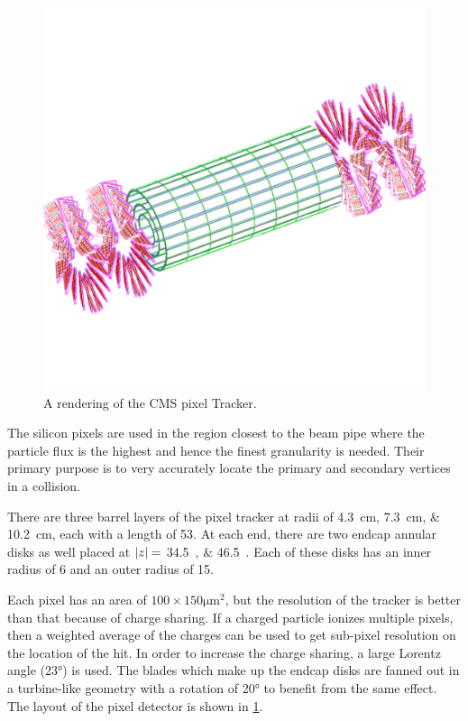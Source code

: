 \begin{figure}[!htbp]
    \centering
    \includegraphics[width=\textwidth]{figures/pixel_layout.pdf}
    \caption{
        A rendering of the CMS pixel Tracker.
    }
    \label{fig:pixel_layout}
\end{figure}

The silicon pixels are used in the region closest to the beam pipe where the
particle flux is the highest and hence the finest granularity is needed. Their
primary purpose is to very accurately locate the primary and secondary vertices
in a collision.

There are three barrel layers of the pixel tracker at radii of
\SIlist{4.3;7.3;10.2}{\centi\meter}, each with a length of
\SI{53}{\centi{\meter}}. At each end, there are two endcap annular disks as well
placed at $|z|=$ \SIlist{34.5;46.5}{\centi{\meter}}. Each of these disks
has an inner radius of \SI{6}{\centi{\meter}} and an outer radius of
\SI{15}{\centi{\meter}}.

Each pixel has an area of $100 \times 150 \si{\micro\meter\squared}$, but the
resolution of the tracker is better than that because of charge sharing. If a
charged particle ionizes multiple pixels, then a weighted average of the
charges can be used to get sub-pixel resolution on the location of the hit. In
order to increase the charge sharing, a large Lorentz angle (\ang{23}) is
used. The blades which make up the endcap disks are fanned out in a
turbine-like geometry with a rotation of \ang{20} to benefit from the same
effect. The layout of the pixel detector is shown in \cref{fig:pixel_layout}.

